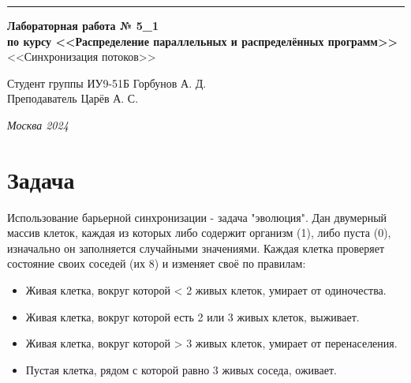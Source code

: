 \documentclass[a4paper, 14pt]{extarticle}
\begin{document}
\begin{titlepage}
\vspace*{-16pt}
\hspace{30pt}\rule{0.866\textwidth}{0.4pt}
  
\vspace{11em}

\begin{center}
\Large {\bf Лабораторная работа № 5\_1} \\ 
\large {\bf по курсу <<Распределение параллельных и распределённых программ>>}\\
\large <<Синхронизация потоков>>
\end{center}\normalsize

\vspace{8em}


\begin{flushright}
  {Студент группы ИУ9-51Б Горбунов А. Д.\hspace*{15pt} \\
  \vspace{2ex}
  Преподаватель Царёв А. С.\hspace*{15pt}}
\end{flushright}

\bigskip

\vfill
 

\begin{center}
\textsl{Москва 2024}
\end{center}
\end{titlepage}

\renewcommand{\ttdefault}{pcr}

\setlength{\tabcolsep}{3pt}
\newpage
\setcounter{page}{2}

\section{Задача}\label{Sect::task}
\par
    Использование барьерной синхронизации - задача "эволюция". Дан двумерный массив клеток, каждая из которых либо содержит организм (1), либо пуста (0), изначально он заполняется случайными значениями. Каждая клетка проверяет состояние своих соседей (их 8) и изменяет своё по правилам:

    \begin{itemize}
        \item Живая клетка, вокруг которой < 2 живых клеток, умирает от одиночества.
        \item Живая клетка, вокруг которой есть 2 или 3 живых клеток, выживает.
        \item Живая клетка, вокруг которой > 3 живых клеток, умирает от перенаселения.
        \item Пустая клетка, рядом с которой равно 3 живых соседа, оживает.
    \end{itemize}
\end{document}
